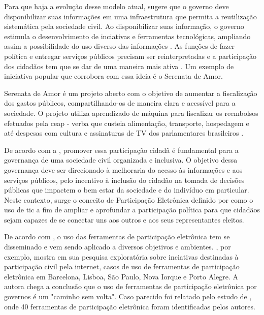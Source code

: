\par
Para que haja a evolução desse modelo atual,  sugere que o governo deve disponibilizar suas informações em uma infraestrutura que permita a reutilização
sistemática pela sociedade civil. Ao disponibilizar suas informação, o governo estimula o desenvolvimento de inciativas e ferramentas tecnológicas, ampliando assim a possibilidade 
do uso diverso das informações \cite{zuiderwijk2012socio}. As funções de fazer política e entregar serviços públicos precisam ser reinterpretadas e a participação dos cidadãos
tem que se dar de uma maneira mais ativa \cite{bovaird2007beyond}. Um exemplo de iniciativa popular que corrobora com essa ideia é o Serenata de Amor.

\par
Serenata de Amor é um projeto aberto com o objetivo de aumentar a fiscalização dos gastos públicos, compartilhando-os de maneira clara e acessível para a sociedade. O projeto utiliza
aprendizado de máquina para fiscalizar os reembolsos efetuados pela \acrfull{ceap} - verba que custeia alimentação, transporte, hospedagem e até despesas com cultura e 
assinaturas de TV dos parlamentares brasileiros \cite{serenata}. 


\par
De acordo com a , promover essa participação cidadã é fundamental para a governança de uma sociedade civil organizada e inclusiva. O objetivo dessa governança deve
ser direcionado à melhoraria do acesso às informações e aos serviços públicos, pelo incentivo à inclusão do cidadão na tomada de decisões públicas que impactem o bem estar da 
sociedade e do indivíduo em particular.  Neste contexto, surge o conceito de Participação Eletrônica definido por  como o uso de \acrshort{tic}
a fim de ampliar e aprofundar a participação política para que cidadãos sejam capazes de se conectar uns aos outros e aos seus representantes eleitos. 

\par 
De acordo com , o uso das ferramentas de participação eletrônica tem se disseminado e vem sendo aplicado a diversos objetivos e ambientes. 
, por exemplo, mostra em sua pesquisa exploratória sobre inciativas destinadas à participação civil
pela internet, casos de uso de ferramentas de participação eletrônica em Barcelona, Lisboa, São Paulo, Nova Iorque e Porto Alegre. A autora chega a conclusão 
que o uso de ferramentas de participação eletrônica por governos é um "caminho sem volta". Caso parecido foi relatado pelo estudo de , onde 40 ferramentas
de participação eletrônica foram identificadas pelos autores. 


